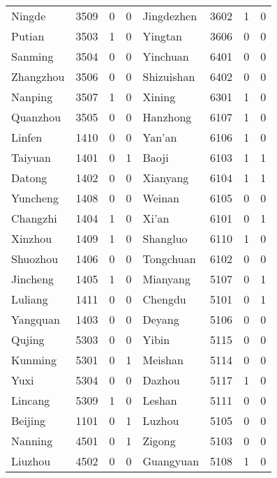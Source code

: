 \documentclass[12pt]{article}
\begin{document}
\begin{table}[!htb]
\begin{adjustbox}{width=\textwidth, totalheight=\baselineskip,keepaspectratio}
\begin{tabular}{llrlllrl}
        Ningde &  3509 &    0 &   0 &   Jingdezhen &  3602 &    1 &   0 \\
        Putian &  3503 &    1 &   0 &      Yingtan &  3606 &    0 &   0 \\
       Sanming &  3504 &    0 &   0 &     Yinchuan &  6401 &    0 &   0 \\
     Zhangzhou &  3506 &    0 &   0 &   Shizuishan &  6402 &    0 &   0 \\
       Nanping &  3507 &    1 &   0 &       Xining &  6301 &    1 &   0 \\
      Quanzhou &  3505 &    0 &   0 &     Hanzhong &  6107 &    1 &   0 \\
        Linfen &  1410 &    0 &   0 &       Yan'an &  6106 &    1 &   0 \\
       Taiyuan &  1401 &    0 &   1 &        Baoji &  6103 &    1 &   1 \\
        Datong &  1402 &    0 &   0 &     Xianyang &  6104 &    1 &   1 \\
      Yuncheng &  1408 &    0 &   0 &       Weinan &  6105 &    0 &   0 \\
      Changzhi &  1404 &    1 &   0 &        Xi'an &  6101 &    0 &   1 \\
       Xinzhou &  1409 &    1 &   0 &     Shangluo &  6110 &    1 &   0 \\
      Shuozhou &  1406 &    0 &   0 &    Tongchuan &  6102 &    0 &   0 \\
      Jincheng &  1405 &    1 &   0 &     Mianyang &  5107 &    0 &   1 \\
       Luliang &  1411 &    0 &   0 &      Chengdu &  5101 &    0 &   1 \\
      Yangquan &  1403 &    0 &   0 &       Deyang &  5106 &    0 &   0 \\
        Qujing &  5303 &    0 &   0 &        Yibin &  5115 &    0 &   0 \\
       Kunming &  5301 &    0 &   1 &      Meishan &  5114 &    0 &   0 \\
          Yuxi &  5304 &    0 &   0 &       Dazhou &  5117 &    1 &   0 \\
       Lincang &  5309 &    1 &   0 &       Leshan &  5111 &    0 &   0 \\
       Beijing &  1101 &    0 &   1 &       Luzhou &  5105 &    0 &   0 \\
       Nanning &  4501 &    0 &   1 &       Zigong &  5103 &    0 &   0 \\
       Liuzhou &  4502 &    0 &   0 &    Guangyuan &  5108 &    1 &   0 \\

\end{tabular}
\end{adjustbox}
\end{table}
\end{document}
